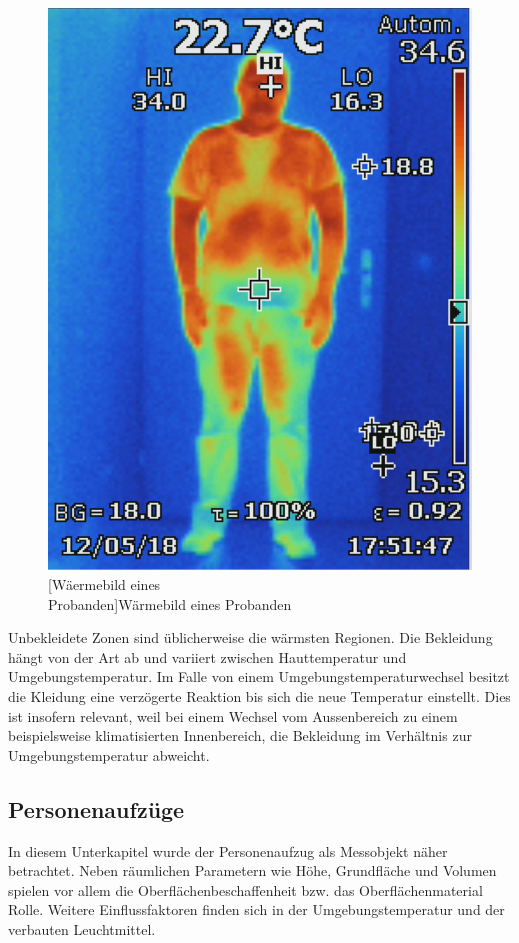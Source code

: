 \begin{figure}[!ht]
\begin{minipage}[b]{0.4\linewidth}
		\includegraphics[width=0.8\linewidth]{fig/waermebild2.png}
		[Wäermebild eines\\Probanden]{Wärmebild eines Probanden}
		\label{fig:Waermebild2}	
	\end{minipage}
\end{figure}

 Unbekleidete Zonen sind üblicherweise die wärmsten Regionen. Die Bekleidung hängt von der Art ab und variiert zwischen Hauttemperatur und Umgebungstemperatur. Im Falle von einem Umgebungstemperaturwechsel besitzt die Kleidung eine verzögerte Reaktion bis sich die neue Temperatur einstellt. Dies ist insofern relevant, weil bei einem Wechsel vom Aussenbereich zu einem beispielsweise klimatisierten Innenbereich, die Bekleidung im Verhältnis zur Umgebungstemperatur abweicht.

\subsection{Personenaufzüge}
\label{subsec:Personenaufzuege}
In diesem Unterkapitel wurde der Personenaufzug als Messobjekt näher betrachtet. Neben räumlichen Parametern wie Höhe, Grundfläche und Volumen spielen vor allem die Oberflächenbeschaffenheit bzw. das Oberflächenmaterial Rolle. Weitere Einflussfaktoren finden sich in der Umgebungstemperatur und der verbauten Leuchtmittel.

